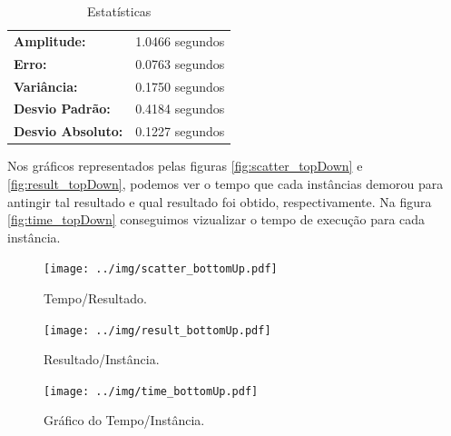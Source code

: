 \documentclass[a4paper, 12pt]{article}
\begin{document}

\begin{table}[!htb]
    \begin{tabular}{ll}
    \textbf{Amplitude:} & 1.0466 segundos \\
    \textbf{Erro:} & 0.0763 segundos \\
    \textbf{Variância:} & 0.1750 segundos \\
    \textbf{Desvio Padrão:} & 0.4184 segundos \\
    \textbf{Desvio Absoluto:} & 0.1227 segundos
    \end{tabular}
    \caption{Estatísticas}
    \label{tab:estatistica_bottomup}
\end{table}

\newpage
Nos gráficos representados pelas figuras \ref{fig:scatter_topDown} e \ref{fig:result_topDown}, podemos ver o tempo
que cada instâncias demorou para antingir tal resultado e qual resultado foi obtido, respectivamente. 
Na figura \ref{fig:time_topDown} conseguimos vizualizar o tempo de execução para cada instância.
\begin{figure}[!htb]
    \centering
    \begin{minipage}{0.55\textwidth}
        \centering
        \texttt{[image: ../img/scatter\_bottomUp.pdf]}
        \caption{Tempo/Resultado.}
        \label{fig:scatter_bottomUp}
    \end{minipage}%
    \begin{minipage}{0.55\textwidth}
        \centering
        \texttt{[image: ../img/result\_bottomUp.pdf]}
        \caption{Resultado/Instância.}
        \label{fig:result_bottomUp}
    \end{minipage}
\end{figure}

\begin{figure}[!htb]
    \centering
    \texttt{[image: ../img/time\_bottomUp.pdf]}
    \caption{Gráfico do Tempo/Instância.}
    \label{fig:time_bottomUp}
\end{figure}

\clearpage
\end{document}
